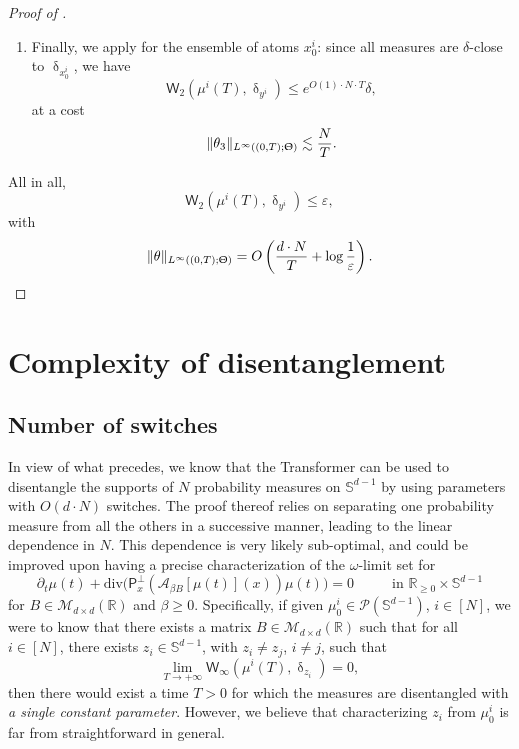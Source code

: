 \documentclass[a4paper,11pt]{article}
\theoremstyle{plain}
\newcommand{\R}{\mathbb{R}}
\newcommand{\proj}{\bm{\mathsf{P}}^\perp}
\newcommand{\dive}{\mathrm{div}}
\renewcommand{\S}{\mathbb{S}^{d-1}}
\newcommand{\bB}{\bm{\mathit{B}}}
\renewcommand{\leq}{\leqslant}
\renewcommand{\geq}{\geqslant}
\numberwithin{equation}{section}
\begin{document}
\begin{proof}[Proof of ]
\begin{enumerate}
\item Finally, we apply  for the ensemble of atoms $x_0^i$: since all measures are $\delta$-close to $\updelta_{x_0^i}$, we have
\begin{equation*}
    \mathsf{W}_2\left(\mu^i(T),\updelta_{y^i}\right)\leq e^{O(1)\cdot N\cdot T}\delta,
\end{equation*}
at a cost
\begin{equation*}
     \|\theta_3\|_{L^\infty((0,T);\Uptheta)}\lesssim \frac{N}{T}.
\end{equation*}
\end{enumerate}
All in all,  $$\mathsf{W}_2\left(\mu^i(T),\updelta_{y^i}\right)\leq \varepsilon,$$
with
\begin{equation*}
    \|\theta\|_{L^\infty((0,T);\Uptheta)}=O\left(\frac{d\cdot N}{T}+\log \frac{1}{\varepsilon}\right).\qedhere
\end{equation*}
\end{proof}





\section{Complexity of disentanglement} \label{sec: complexity.untanglement}

\subsection{Number of switches}
In view of what precedes, we know that the Transformer can be used to disentangle the supports of $N$ probability measures on $\S$ by using parameters with $O(d\cdot N)$ switches. 
The proof thereof relies on separating one probability measure from all the others in a successive manner, leading to the linear dependence in $N$. This dependence is very likely sub-optimal, and could be improved upon having a precise characterization of the $\omega$-limit set for
\begin{equation*}
    \partial_t \mu(t)+\dive\Big(\proj_x(\mathscr{A}_{\beta\bB} [\mu(t)](x))\mu(t)\Big)=0 \hspace{1cm} \text{ in } \mathbb{R}_{\geq0}\times\S
\end{equation*}
for $\bB\in\mathscr{M}_{d\times d}(\R)$ and $\beta\geq0$. 
Specifically, if given $\mu_0^i\in\mathscr{P}(\S)$, $i\in[N]$, we were to know that there exists a matrix $\bB\in\mathscr{M}_{d\times d}(\mathbb{R})$ such that for all $i\in[N]$, there exists $z_i\in\S$, with $z_i\neq z_j$, $i\neq j$, such that
\begin{equation*}
\lim_{T\to+\infty}\mathsf{W}_{\infty}\left(\mu^i(T),\updelta_{z_i}\right)=0,
\end{equation*}
then there would exist a time $T>0$ for which the measures are disentangled with \emph{a single constant parameter}. 
However, we believe that characterizing $z_i$ from $\mu_0^i$ is far from straightforward in general. 
\end{document}
